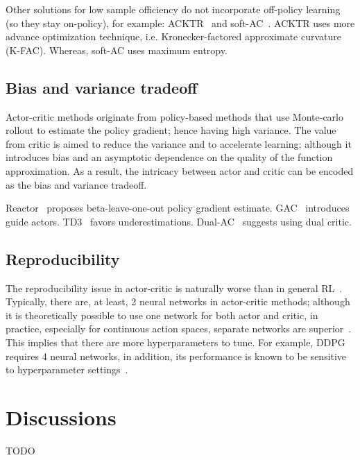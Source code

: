 Other solutions for low sample officiency do not incorporate off-policy learning
(so they stay on-policy), for example: ACKTR~\cite{} and soft-AC~\cite{}.
ACKTR uses more advance optimization technique, i.e. Kronecker-factored approximate curvature (K-FAC).
Whereas, soft-AC uses maximum entropy.

\subsection{Bias and variance tradeoff}
Actor-critic methods originate from policy-based methods that
use Monte-carlo rollout to estimate the policy gradient; hence having high variance.
The value from critic is aimed to reduce the variance and to accelerate learning;
although it introduces bias and an asymptotic dependence on the quality of the function approximation.
As a result, the intricacy between actor and critic can be encoded as the bias and variance tradeoff.

Reactor~\cite{} proposes beta-leave-one-out policy gradient estimate.
GAC~\cite{} introduces guide actors.
TD3~\cite{} favors underestimations.
Dual-AC~\cite{} suggests using dual critic.

\subsection{Reproducibility}
The reproducibility issue in actor-critic is naturally worse than in general RL~\cite{}.
Typically, there are, at least, 2 neural networks in actor-critic methods;
although it is theoretically possible to use one network for both actor and critic,
in practice, especially for continuous action spaces, separate networks are superior~\cite{A3c}.
This implies that there are more hyperparameters to tune.
For example, DDPG~\cite{} requires 4 neural networks, in addition,
its performance is known to be sensitive to hyperparameter settings~\cite{}.

\section{Discussions}
TODO
